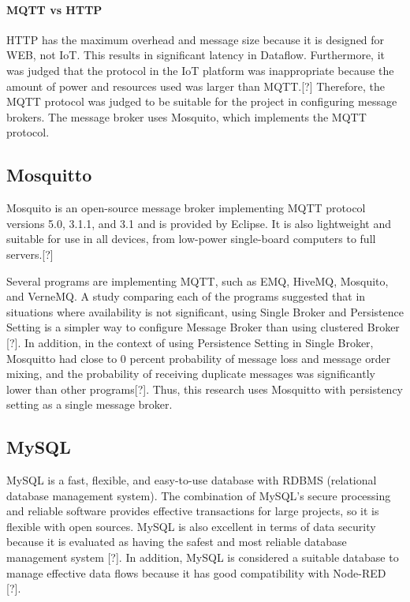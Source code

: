\documentclass[conference]{IEEEtran}
\begin{document}
\paragraph{MQTT vs HTTP}
\hfill \break
HTTP has the maximum overhead and message size because it is designed for WEB, not IoT. This results in significant latency in Dataflow.
Furthermore, it was judged that the protocol in the IoT platform was inappropriate because the amount of power and resources used was larger than MQTT.[?]
Therefore, the MQTT protocol was judged to be suitable for the project in configuring message brokers. The message broker uses Mosquito, which implements the MQTT protocol.

\subsection{Mosquitto}
Mosquito is an open-source message broker implementing MQTT protocol versions 5.0, 3.1.1, and 3.1 and is provided by Eclipse. It is also lightweight and suitable for use in all devices, from low-power single-board computers to full servers.[?]

Several programs are implementing MQTT, such as EMQ, HiveMQ, Mosquito, and VerneMQ. A study comparing each of the programs suggested that in situations where availability is not significant, using Single Broker and Persistence Setting is a simpler way to configure Message Broker than using clustered Broker [?]. In addition, in the context of using Persistence Setting in Single Broker, Mosquitto had close to 0 percent probability of message loss and message order mixing, and the probability of receiving duplicate messages was significantly lower than other programs[?]. Thus, this research uses Mosquitto with persistency setting as a single message broker.

\subsection{MySQL}
MySQL is a fast, flexible, and easy-to-use database with RDBMS (relational database management system). The combination of MySQL's secure processing and reliable software provides effective transactions for large projects, so it is flexible with open sources. MySQL is also excellent in terms of data security because it is evaluated as having the safest and most reliable database management system [?]. In addition, MySQL is considered a suitable database to manage effective data flows because it has good compatibility with Node-RED [?].
\end{document}
